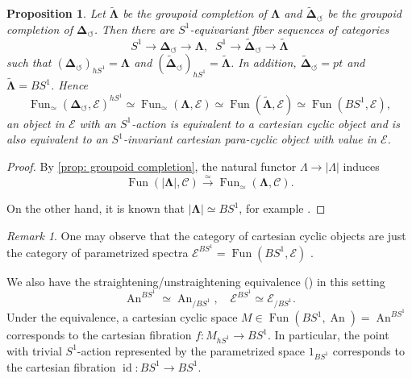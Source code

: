 \documentclass[11pt]{amsart}
\numberwithin{equation}{section}
\theoremstyle{plain}
\newtheorem{Prop}[prop]{Proposition}
\theoremstyle{definition}
\theoremstyle{remark}
\newtheorem{RMK}[rmk]{Remark}
\newcommand{\cC} { {\mathcal{C}}}
\newcommand{\cE} { {\mathcal{E}}}
\newcommand{\id}{{\operatorname{id}}}
\newcommand\Fun{\operatorname{Fun}}
\newcommand\An{ {\operatorname{An} } }
\begin{document}
\begin{Prop}\label{prop:paracyclic}
    Let $\widetilde{\boldsymbol{\Lambda}}$ be the groupoid completion of $\boldsymbol{\Lambda}$ and $\widetilde{\boldsymbol{\Delta}}_\circlearrowleft$ be the groupoid completion of $\boldsymbol{\Delta}_\circlearrowleft$. Then there are $S^1$-equivariant fiber sequences of categories
    \[S^1 \to \boldsymbol{\Delta}_\circlearrowleft \to \boldsymbol{\Lambda}, \;\; S^1 \to \widetilde{\boldsymbol{\Delta}}_\circlearrowleft \to \widetilde{\boldsymbol{\Lambda}}\]
    such that $(\boldsymbol{\Delta}_\circlearrowleft)_{hS^1} = \boldsymbol{\Lambda}$ and $(\widetilde{\boldsymbol{\Delta}}_\circlearrowleft)_{hS^1} = \widetilde{\boldsymbol{\Lambda}}$. In addition, $\widetilde{\boldsymbol{\Delta}}_\circlearrowleft = pt$ and $\widetilde{\boldsymbol{\Lambda}} = BS^1$. Hence
    \[\Fun_\simeq(\boldsymbol{\Delta}_\circlearrowleft, \cE)^{hS^1} \simeq \Fun_\simeq(\boldsymbol{\Lambda}, \cE) \simeq \Fun(\widetilde{\boldsymbol{\Lambda}}, \cE) \simeq \Fun(BS^1, \cE),\]
    an object in $\cE$ with an $S^1$-action is equivalent to a cartesian cyclic object and is also equivalent to an $S^1$-invariant cartesian para-cyclic object with value in $\cE$.
\end{Prop}
\begin{proof}By \autoref{prop: groupoid completion}, the natural functor $\Lambda\to |\Lambda|$ induces
\[\Fun(|\boldsymbol{\Lambda}|,\cC) \xrightarrow{\simeq}\Fun_\simeq (\boldsymbol{\Lambda}, \cC).\] 

On the other hand, it is known that $|\boldsymbol{\Lambda}|\simeq BS^1$, for example \cite[Théorème 10]{Connes1983}.
\end{proof}


\begin{RMK}
    One may observe that the category of cartesian cyclic objects are just the category of parametrized spectra $\cE^{BS^1} = \Fun(BS^1, \cE)$ \cite{AndoBlumbergGepner,AndoBlumbergGepnerHopkinsRezk}. 
    
    We also have the straightening/unstraightening equivalence (\cite[Theorem 2.2.1.2]{HTT}) in this setting
\[\An^{BS^1} \simeq \An_{/BS^1}, \quad \cE^{BS^1} \simeq \cE_{/BS^1}.\]
Under the equivalence, a cartesian cyclic space $M \in \Fun(BS^1, \An) = \An^{BS^1}$ corresponds to the cartesian fibration $f: M_{hS^1} \to BS^1$. In particular, the point with trivial $S^1$-action represented by the parametrized space $1_{BS^1}$ corresponds to the cartesian fibration $\id: BS^1 \to BS^1$.
\end{RMK}
\end{document}
